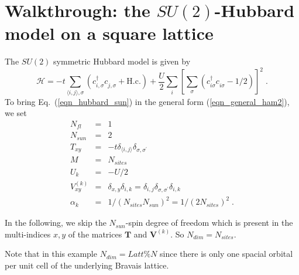 \section{Walkthrough: the $SU(2)$-Hubbard model on a square lattice}
The $SU(2)$ symmetric Hubbard model is given by
\begin{equation}
\label{eqn_hubbard_sun}
\mathcal{H}=
-t\sum\limits_{\langle i,j\rangle,\sigma} 
\left(c^{\dagger}_{i,\sigma} c^{\phantom\dagger}_{j,\sigma} + \text{H.c.}
\right)
+ \frac{U}{2}\sum\limits_{i}\left[
\sum\limits_{\sigma}
\left(  c^{\dagger}_{i\sigma} c^{\phantom\dagger}_{i\sigma}  -1/2 \right) \right]^{2}\;.
\end{equation}
To bring Eq.~(\ref{eqn_hubbard_sun}) in the general form (\ref{eqn_general_ham2}), we set
\begin{eqnarray}
N_{fl}&=&1\nonumber\\
N_{sun}&=&2\nonumber\\
T_{x y}&=&-t\delta_{\langle i,j\rangle}\delta_{\sigma,\sigma^{\prime}}\nonumber\\
M&=&N_{sites}\nonumber\\
U_{k}&=&-U/2\nonumber\\
V_{x y}^{(k)}&=&
\delta_{x,y}\delta_{i,k}=
\delta_{i,j}\delta_{\sigma,\sigma^{\prime}}\delta_{i,k}\nonumber\\
\alpha_{k}&=&1/(N_{sites}N_{sun})^{2}=1/(2 N_{sites})^{2}\;.
\end{eqnarray}

In the following, we skip the $N_{sun}$-spin degree of freedom which is present in the multi-indices $x,y$ of the matrices $\bm{T}$ and ${\bm V}^{(k)}$. 
So $N_{dim}=N_{sites}$. 


Note that in this example $N_{dim}=Latt\%N$ since there is only one spacial orbital per unit cell of the underlying Bravais lattice.

